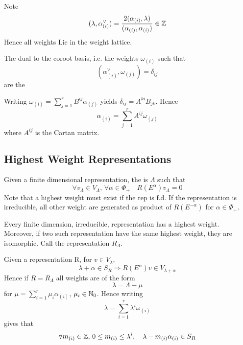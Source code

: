 \documentclass{article}
\begin{document}
\begin{theorem}
	Note 
	\[
	(\lambda, \alpha^\vee_{(i)})=\frac{2(\alpha_{(i)},\lambda)}{(\alpha_{(i)},\alpha_{(i)})} \in \mathbb{Z}
	\]
	Hence all weights Lie in the weight lattice. 
\end{theorem}



\begin{definition}
	The dual to the coroot basis, i.e. the weights $\omega_{(i)}$ such that 
	\[
	(\alpha^\vee_{(i)}, \omega_{(j)})=\delta_{ij}
	\]
	are the 
\end{definition}

\begin{fact}
	Writing $\omega_{(i)}=\sum_{j=1}^r B^{ij} \alpha_{(j)}$ yields $\delta_{ij}=A^{ki}B_{jk}$. Hence 
	\[
	\alpha_{(i)}=\sum_{j=1}^r A^{ij} \omega_{(j)}
	\]
	where $A^{ij}$ is the Cartan matrix. 
\end{fact}

\subsection{Highest Weight Representations}

\begin{definition}
	Given a finite dimensional representation, the  is $\Lambda$ such that 
	\[
	\forall v_\Lambda\in V_\Lambda, \, \forall \alpha\in\Phi_+ \quad R(E^\alpha)v_\Lambda=0
	\]
	Note that a highest weight must exist if the rep is f.d. If the representation is irreducible, all other weight are generated as product of $R(E^{-\alpha})$ for $\alpha\in\Phi_+$. 
\end{definition}

\begin{theorem}
	Every finite dimension, irreducible, representation has a highest weight. Moreover, if two such representation have the same highest weight, they are isomorphic. Call the representation $R_\Lambda$. 
\end{theorem}

\begin{fact}
	Given a representation R, for $v\in V_\lambda$, 
	\[
	\lambda+\alpha\in S_R \Rightarrow R(E^\alpha)v \in V_{\lambda+\alpha}
	\]
	Hence if $R=R_\Lambda$ all weights are of the form 
	\[
	\lambda=\Lambda-\mu
	\]
	for $\mu=\sum_{i=1}^r \mu_i \alpha_{(i)}$, $\mu_i\in\mathbb{N}_0$. Hence writing 
	\[
	\lambda=\sum_{i=1}^r \lambda^i \omega_{(i)}
	\]
	gives that
	\[
	\forall m_{(i)}\in\mathbb{Z}, \, 0\leq m_{(i)}\leq \lambda^i, \quad \lambda-m_{(i)}\alpha_{(i)}\in S_R
	\]
\end{fact}
\end{document}
